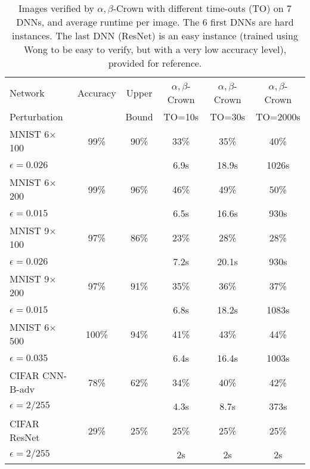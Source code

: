 \begin{table}[t!]
	\centering
	\begin{tabular}{||l|c|c||c|c|c||}
		\hline
		Network & Accuracy & Upper  & $\alpha,\beta$-Crown& $\alpha,\beta$-Crown & $\alpha,\beta$-Crown \\ 
		Perturbation &   & Bound & TO=10s & TO=30s & TO=2000s\\ \hline
		MNIST 6$\times$100 & 99\% & 90\% & 33\% & 35\% & 40\%   \\
		$\epsilon = 0.026$ &  &  & 6.9s &  18.9s &  1026s  \\  \hline
		MNIST 6$\times$200 & 99\%  & 96\%  & 46\%  & 49\%  & 50\%   \\ 
		$\epsilon = 0.015$ & &  & 6.5s &  16.6s &  930s  \\  \hline
		MNIST 9$\times$100 & 97\%  & 86\%  & 23\%  & 28\%  & 28\%   \\
		$\epsilon = 0.026$ &  &  & 7.2s &  20.1s &  930s  \\  \hline
		MNIST 9$\times$200 & 97\%  & 91\%  & 35\%  & 36\%  & 37\%   \\ 
		$\epsilon = 0.015$ & &  & 6.8s &  18.2s &  1083s  \\  \hline
		MNIST 6$\times$500 & 100\%  & 94\%  & 41\%  & 43\%  & 44\%   \\ 
		$\epsilon = 0.035$ & &  & 6.4s &  16.4s &  1003s  \\  \hline
		CIFAR CNN-B-adv & 78\%  & 62\%  &  34\% & 40\%  & 42\%   \\
		$\epsilon = 2/255$&  &  & 4.3s & 8.7s & 373s  \\ \hline \hline
		CIFAR ResNet & 29\%  & 25\%  & 25\%  & 25\%  & 25\%   \\
		$\epsilon = 2/255$ &  &  & 2s & 2s & 2s  \\ \hline
	\end{tabular}
	\caption{Images verified by $\alpha,\beta$-Crown with different time-outs (TO) on 7 DNNs, and average runtime per image. The 6 first DNNs are hard instances. The last DNN (ResNet) is an easy instance (trained using Wong to be easy to verify, but with a very low accuracy level), provided for reference.}
	\label{table_beta}
	\vspace{-0.3cm}
\end{table}



